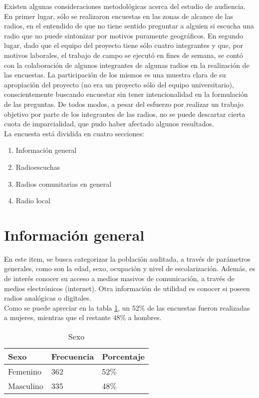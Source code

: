 \indent Existen algunas consideraciones metodológicas acerca del estudio de audiencia. En primer lugar, sólo se realizaron encuestas en las zonas de alcance de las radios, en el entendido de que no tiene sentido preguntar a alguien si escucha una radio que no puede sintonizar por motivos puramente geográficos. En segundo lugar, dado que el equipo del proyecto tiene sólo cuatro integrantes y que, por motivos laborales, el trabajo de campo se ejecutó en fines de semana, se contó con la colaboración de algunos integrantes de algunas radios en la realización de las encuestas. La participación de los mismos es una muestra clara de su apropiación del proyecto (no era un proyecto sólo del equipo universitario), conscientemente buscando encuestar sin tener intencionalidad en la formulación de las preguntas. De todos modos, a pesar del esfuerzo por realizar un trabajo objetivo por parte de los integrantes de las radios, no se puede descartar cierta cuota de imparcialidad, que pudo haber afectado algunos resultados.\\

\indent La encuesta está dividida en cuatro secciones:

\begin{enumerate}
     \item Informaci\'on general
     \item Radioescuchas
     \item Radios comunitarias en general
     \item Radio local
\end{enumerate}

\section{Información general}

\indent En este item, se busca categorizar la poblaci\'on auditada, a trav\'es de par\'ametros generales, como son la edad, sexo, ocupaci\'on y nivel de escolarizaci\'on. Adem\'as, es de inter\'es conocer su acceso a medios masivos de comunicaci\'on, a trav\'es de medios electr\'onicos (internet). Otra informaci\'on de utilidad es conocer si poseen radios anal\'ogicas o digitales.\\

\indent Como se puede apreciar en la tabla \ref{SexoTabla}, un 52$\%$ de las encuestas fueron realizadas a mujeres, mientras que el restante 48$\%$ a hombres.

\begin{table}[ht]
	\centering
{}
		\begin{tabular}{|l|l|l|}\hline
      	\textbf{Sexo}&\textbf{Frecuencia}&\textbf{Porcentaje}\\\hline\hline
			Femenino	&	362&	52$\%$\\\hline
			Masculino 	&	335&	48$\%$\\\hline
		\end{tabular}
	  \caption{Sexo}
	  \label{SexoTabla}
\end{table}


